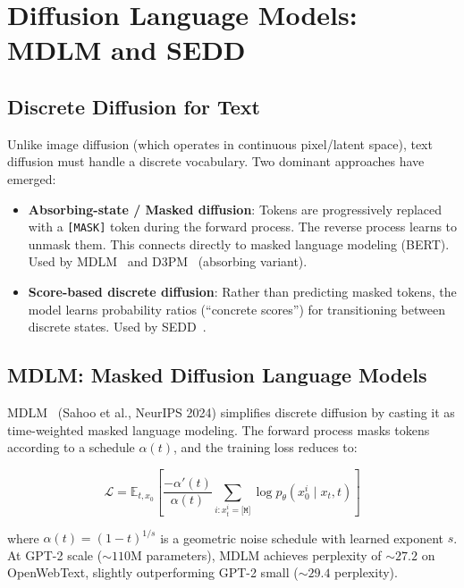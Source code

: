 \documentclass[11pt,letterpaper]{article}
\begin{document}
\section{Diffusion Language Models: MDLM and SEDD}
\label{sec:diffusion}

\subsection{Discrete Diffusion for Text}

Unlike image diffusion (which operates in continuous pixel/latent space), text diffusion must handle a discrete vocabulary. Two dominant approaches have emerged:

\begin{itemize}[noitemsep]
    \item \textbf{Absorbing-state / Masked diffusion}: Tokens are progressively replaced with a \texttt{[MASK]} token during the forward process. The reverse process learns to unmask them. This connects directly to masked language modeling (BERT). Used by MDLM~\cite{mdlm} and D3PM~\cite{d3pm} (absorbing variant).

    \item \textbf{Score-based discrete diffusion}: Rather than predicting masked tokens, the model learns probability ratios (``concrete scores'') for transitioning between discrete states. Used by SEDD~\cite{sedd}.
\end{itemize}

\subsection{MDLM: Masked Diffusion Language Models}

MDLM~\cite{mdlm} (Sahoo et al., NeurIPS 2024) simplifies discrete diffusion by casting it as time-weighted masked language modeling. The forward process masks tokens according to a schedule $\alpha(t)$, and the training loss reduces to:

\begin{equation}
    \mathcal{L} = \mathbb{E}_{t, x_0} \left[ \frac{-\alpha'(t)}{\alpha(t)} \sum_{i: x_t^i = \texttt{[M]}} \log p_\theta(x_0^i \mid x_t, t) \right]
    \label{eq:mdlm-loss}
\end{equation}

where $\alpha(t) = (1-t)^{1/s}$ is a geometric noise schedule with learned exponent $s$. At GPT-2 scale (${\sim}110$M parameters), MDLM achieves perplexity of ${\sim}27.2$ on OpenWebText, slightly outperforming GPT-2 small (${\sim}29.4$ perplexity).
\end{document}
